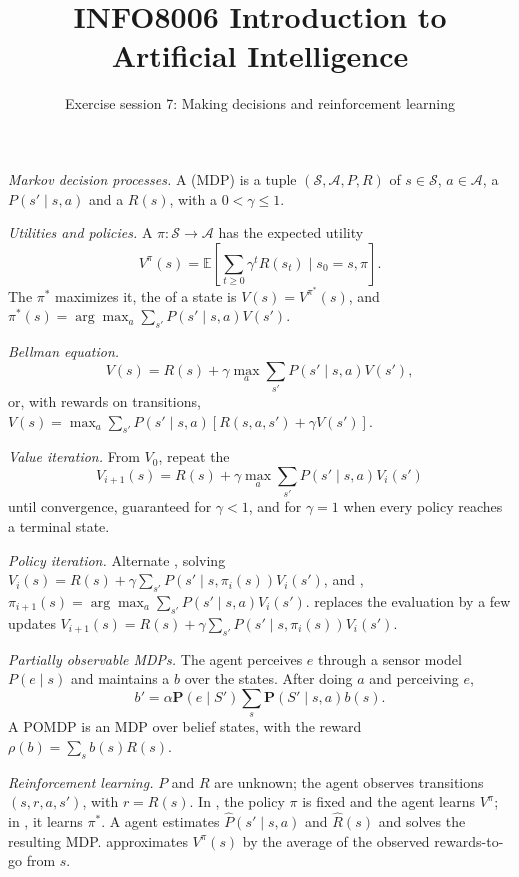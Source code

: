 \documentclass[11pt, a4paper]{exam}
\title{\bfseries INFO8006 Introduction to Artificial Intelligence}
\author{Exercise session 7: Making decisions and reinforcement learning}
\date{}
\begin{document}
\maketitle

\begin{recap}
    \emph{Markov decision processes.} A  (MDP) is a tuple $(\mathcal{S}, \mathcal{A}, P, R)$ of  $s \in \mathcal{S}$,  $a \in \mathcal{A}$, a  $P(s' \mid s, a)$ and a  $R(s)$, with a  $0 < \gamma \leq 1$.

    \emph{Utilities and policies.} A  $\pi : \mathcal{S} \to \mathcal{A}$ has the expected utility
    \[
        V^\pi(s) = \mathbb{E}\left[\sum_{t \geq 0} \gamma^t R(s_t) \mid s_0 = s, \pi \right].
    \]
    The  $\pi^*$ maximizes it, the  of a state is $V(s) = V^{\pi^*}(s)$, and $\pi^*(s) = \arg \max_a \sum_{s'} P(s' \mid s, a) V(s')$.

    \emph{Bellman equation.}
    \[
        V(s) = R(s) + \gamma \max_a \sum_{s'} P(s' \mid s, a) V(s'),
    \]
    or, with rewards on transitions, $V(s) = \max_a \sum_{s'} P(s' \mid s, a) [R(s, a, s') + \gamma V(s')]$.

    \emph{Value iteration.} From $V_0$, repeat the 
    \[
        V_{i+1}(s) = R(s) + \gamma \max_a \sum_{s'} P(s' \mid s, a) V_i(s')
    \]
    until convergence, guaranteed for $\gamma < 1$, and for $\gamma = 1$ when every policy reaches a terminal state.

    \emph{Policy iteration.} Alternate , solving $V_i(s) = R(s) + \gamma \sum_{s'} P(s' \mid s, \pi_i(s)) V_i(s')$, and , $\pi_{i+1}(s) = \arg \max_a \sum_{s'} P(s' \mid s, a) V_i(s')$.  replaces the evaluation by a few updates $V_{i+1}(s) = R(s) + \gamma \sum_{s'} P(s' \mid s, \pi_i(s)) V_i(s')$.

    \emph{Partially observable MDPs.} The agent perceives $e$ through a sensor model $P(e \mid s)$ and maintains a  $b$ over the states. After doing $a$ and perceiving $e$,
    \[
        b' = \alpha \mathbf{P}(e \mid S') \sum_s \mathbf{P}(S' \mid s, a) b(s).
    \]
    A POMDP is an MDP over belief states, with the reward $\rho(b) = \sum_s b(s) R(s)$.

    \emph{Reinforcement learning.} $P$ and $R$ are unknown; the agent observes transitions $(s, r, a, s')$, with $r = R(s)$. In , the policy $\pi$ is fixed and the agent learns $V^\pi$; in , it learns $\pi^*$. A  agent estimates $\hat{P}(s' \mid s, a)$ and $\hat{R}(s)$ and solves the resulting MDP.  approximates $V^\pi(s)$ by the average of the observed rewards-to-go from $s$.


\end{recap}
\end{document}
